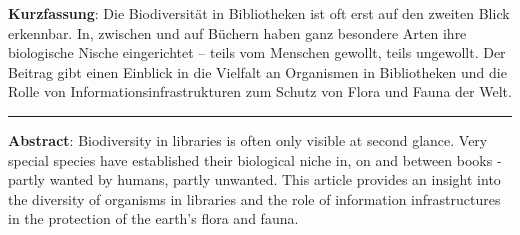 \textbf{Kurzfassung}: Die Biodiversität in Bibliotheken ist oft erst auf
den zweiten Blick erkennbar. In, zwischen und auf Büchern haben ganz
besondere Arten ihre biologische Nische eingerichtet -- teils vom
Menschen gewollt, teils ungewollt. Der Beitrag gibt einen Einblick in
die Vielfalt an Organismen in Bibliotheken und die Rolle von
Informationsinfrastrukturen zum Schutz von Flora und Fauna der Welt.

\begin{center}\rule{0.5\linewidth}{0.5pt}\end{center}

\textbf{Abstract}: Biodiversity in libraries is often only visible at
second glance. Very special species have established their biological
niche in, on and between books - partly wanted by humans, partly
unwanted. This article provides an insight into the diversity of
organisms in libraries and the role of information infrastructures in
the protection of the earth's flora and fauna.

